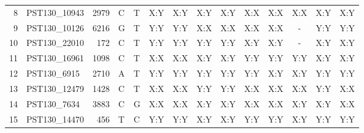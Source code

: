 \begin{sidewaystable}
\begin{localsize}{9}{10}
\begin{tabular}{rlrll|cc|cc|ccc|cc}
  8  & PST130\_10943 & 2979     & C        & T        & X:Y                & X:Y    & X:Y                 & X:Y    & X:X                  & X:X   & X:X    & X:Y                 & X:Y   \\
  9  & PST130\_10126 & 6216     & G        & T        & Y:Y                & Y:Y    & X:X                 & X:X    & X:X                  & X:X   & -      & Y:Y                 & Y:Y   \\
  10 & PST130\_22010 & 172      & C        & T        & Y:Y                & Y:Y    & Y:Y                 & Y:Y    & X:Y                  & X:Y   & -      & X:Y                 & X:Y   \\
  11 & PST130\_16961 & 1098     & C        & T        & X:X                & X:X    & X:Y                 & X:Y    & Y:Y                  & Y:Y   & Y:Y    & X:Y                 & X:Y   \\
  12 & PST130\_6915  & 2710     & A        & T        & Y:Y                & Y:Y    & Y:Y                 & Y:Y    & Y:Y                  & X:Y   & X:Y    & Y:Y                 & Y:Y   \\
  13 & PST130\_12479 & 1428     & C        & T        & X:X                & X:X    & Y:Y                 & Y:Y    & X:X                  & X:X   & X:X    & Y:Y                 & X:X   \\
  14 & PST130\_7634  & 3883     & C        & G        & X:X                & X:X    & X:Y                 & X:Y    & X:X                  & X:X   & X:Y    & X:Y                 & X:X   \\
  15 & PST130\_14470 & 456      & T        & C        & Y:Y                & Y:Y    & X:Y                 & X:Y    & Y:Y                  & Y:Y   & X:Y    & Y:Y                 & Y:Y   \\
\bottomrule
\end{tabular}
\end{localsize}
\end{sidewaystable}
